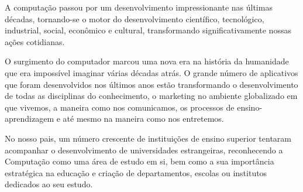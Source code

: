 A computação passou por um desenvolvimento impressionante nas últimas décadas, 
tornando-se o motor do desenvolvimento científico, tecnológico, 
industrial, social, econômico e cultural, transformando significativamente 
nossas ações cotidianas.

O surgimento do computador marcou uma nova era na história da humanidade 
que era impossível imaginar várias décadas atrás. O grande número de aplicativos 
que foram desenvolvidos nos últimos anos estão transformando o desenvolvimento 
de todas as disciplinas do conhecimento, o marketing no ambiente globalizado 
em que vivemos, a maneira como nos comunicamos, os processos de 
ensino-aprendizagem e até mesmo na maneira como nos entretemos.


No nosso pais, um número crescente de instituições de ensino superior
tentaram acompanhar o desenvolvimento de universidades estrangeiras, reconhecendo a Computação como uma área de estudo
em si, bem como a sua importância estratégica na educação e criação de
departamentos, escolas ou institutos dedicados ao seu estudo. 